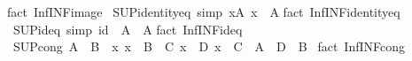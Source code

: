\begin{isabellebody}
%
\isadelimproof
%
\endisadelimproof
%
\isatagproof
{}\isamarkupfalse%
{\isacharparenleft}{\kern0pt}fact\ Inf{\isachardot}{\kern0pt}INF{\isacharunderscore}{\kern0pt}image{\isacharparenright}{\kern0pt}%
\endisatagproof
{\isafoldproof}%
%
\isadelimproof
\isanewline
%
\endisadelimproof
\isanewline
{}\isamarkupfalse%
\ SUP{\isacharunderscore}{\kern0pt}identity{\isacharunderscore}{\kern0pt}eq\ {\isacharbrackleft}{\kern0pt}simp{\isacharbrackright}{\kern0pt}{\isacharcolon}{\kern0pt}\ {\isachardoublequoteopen}{\isacharparenleft}{\kern0pt}{\isasymSqunion}x{\isasymin}A{\isachardot}{\kern0pt}\ x{\isacharparenright}{\kern0pt}\ {\isacharequal}{\kern0pt}\ {\isasymSqunion}A{\isachardoublequoteclose}\isanewline
%
\isadelimproof
%
\endisadelimproof
%
\isatagproof
{}\isamarkupfalse%
{\isacharparenleft}{\kern0pt}fact\ Inf{\isachardot}{\kern0pt}INF{\isacharunderscore}{\kern0pt}identity{\isacharunderscore}{\kern0pt}eq{\isacharparenright}{\kern0pt}%
\endisatagproof
{\isafoldproof}%
%
\isadelimproof
\isanewline
%
\endisadelimproof
\isanewline
{}\isamarkupfalse%
\ SUP{\isacharunderscore}{\kern0pt}id{\isacharunderscore}{\kern0pt}eq\ {\isacharbrackleft}{\kern0pt}simp{\isacharbrackright}{\kern0pt}{\isacharcolon}{\kern0pt}\ {\isachardoublequoteopen}{\isasymSqunion}{\isacharparenleft}{\kern0pt}id\ {\isacharbackquote}{\kern0pt}\ A{\isacharparenright}{\kern0pt}\ {\isacharequal}{\kern0pt}\ {\isasymSqunion}A{\isachardoublequoteclose}\isanewline
%
\isadelimproof
%
\endisadelimproof
%
\isatagproof
{}\isamarkupfalse%
{\isacharparenleft}{\kern0pt}fact\ Inf{\isachardot}{\kern0pt}INF{\isacharunderscore}{\kern0pt}id{\isacharunderscore}{\kern0pt}eq{\isacharparenright}{\kern0pt}%
\endisatagproof
{\isafoldproof}%
%
\isadelimproof
\isanewline
%
\endisadelimproof
\isanewline
{}\isamarkupfalse%
\ SUP{\isacharunderscore}{\kern0pt}cong{\isacharcolon}{\kern0pt}\ {\isachardoublequoteopen}A\ {\isacharequal}{\kern0pt}\ B\ {\isasymLongrightarrow}\ {\isacharparenleft}{\kern0pt}{\isasymAnd}x{\isachardot}{\kern0pt}\ x\ {\isasymin}\ B\ {\isasymLongrightarrow}\ C\ x\ {\isacharequal}{\kern0pt}\ D\ x{\isacharparenright}{\kern0pt}\ {\isasymLongrightarrow}\ {\isasymSqunion}{\isacharparenleft}{\kern0pt}C\ {\isacharbackquote}{\kern0pt}\ A{\isacharparenright}{\kern0pt}\ {\isacharequal}{\kern0pt}\ {\isasymSqunion}{\isacharparenleft}{\kern0pt}D\ {\isacharbackquote}{\kern0pt}\ B{\isacharparenright}{\kern0pt}{\isachardoublequoteclose}\isanewline
%
\isadelimproof
%
\endisadelimproof
%
\isatagproof
{}\isamarkupfalse%
\ {\isacharparenleft}{\kern0pt}fact\ Inf{\isachardot}{\kern0pt}INF{\isacharunderscore}{\kern0pt}cong{\isacharparenright}{\kern0pt}%

\end{isabellebody}
